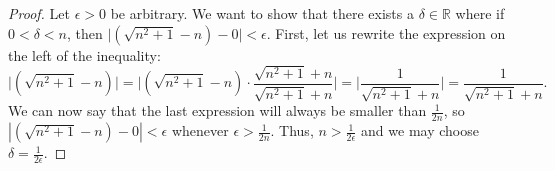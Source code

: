 \documentclass{article}
\begin{document}
\begin{enumerate}
            \begin{proof}
                Let $\epsilon > 0$ be arbitrary. We want to show that there exists a $\delta \in \mathbb{R}$ where if $0 < \delta < n$, then $\big|(\sqrt{n^2+1}-n)-0\big| < \epsilon$. First, let us rewrite the expression on the left of the inequality:
                    \[\Big|(\sqrt{n^2+1}-n)\Big| = \bigg|(\sqrt{n^2+1}-n) \cdot \frac{\sqrt{n^2+1}+n}{\sqrt{n^2+1}+n}\bigg| = \bigg|\frac{1}{\sqrt{n^2+1}+n}\bigg| = \frac{1}{\sqrt{n^2+1}+n}.\]
                We can now say that the last expression will always be smaller than $\frac{1}{2n}$, so $|(\sqrt{n^2+1}-n)-0| < \epsilon$ whenever $\epsilon > \frac{1}{2n}$. Thus, $n> \frac{1}{2\epsilon}$ and we may choose $\delta = \frac{1}{2\epsilon}$.
                
            \end{proof}
            
    \end{enumerate}
\end{document}
